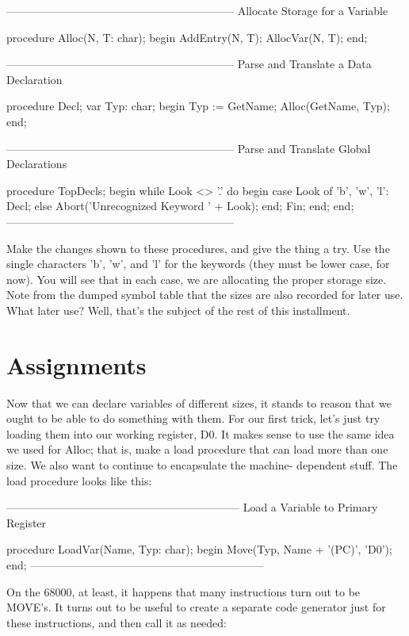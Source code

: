 \documentclass[float=false, crop=false]{standalone}
\begin{document}
{--------------------------------------------------------------}
{ Allocate Storage for a Variable }

procedure Alloc(N, T: char);
begin
   AddEntry(N, T);
   AllocVar(N, T);
end;


{--------------------------------------------------------------}
{ Parse and Translate a Data Declaration }

procedure Decl;
var Typ: char;
begin
   Typ := GetName;
   Alloc(GetName, Typ);
end;


{--------------------------------------------------------------}
{ Parse and Translate Global Declarations }

procedure TopDecls;
begin
   while Look <> '.' do begin
      case Look of
        'b', 'w', 'l': Decl;
      else Abort('Unrecognized Keyword ' + Look);
      end;
      Fin;
   end;
end;
{--------------------------------------------------------------}


Make the changes shown to these procedures, and give the thing a try. Use the
single characters 'b', 'w', and 'l' for the keywords (they must be lower case,
for now). You will see that in each case, we are allocating the proper storage
size. Note from the dumped symbol table that the sizes are also recorded for
later use. What later use? Well, that's the subject of the rest of this
installment.


\section{Assignments}

Now that we can declare variables of different sizes, it stands to reason that
we ought to be able to do something with them. For our first trick, let's just
try loading them into our working register, D0. It makes sense to use the same
idea we used for Alloc; that is, make a load procedure that can load more than
one size. We also want to continue to encapsulate the machine- dependent stuff.
The load procedure looks like this:


{---------------------------------------------------------------}
{ Load a Variable to Primary Register }

procedure LoadVar(Name, Typ: char);
begin
   Move(Typ, Name + '(PC)', 'D0');
end;
{---------------------------------------------------------------}


On the 68000, at least, it happens that many instructions turn out to be MOVE's.
It turns out to be useful to create a separate code generator just for these
instructions, and then call it as needed:
\end{document}
